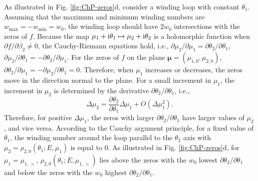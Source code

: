 As illustrated in Fig. \ref{fig:ChP-zeros}d, consider a winding loop
with constant $\theta_{1}$. Assuming that the maximum and minimum
winding numbers are $w_{\text{max}}=-w_{\text{min}}=w_{0}$, the winding
loop should have $2w_{0}$ intersections with the zeros of $f$. Because
the map $\mu_{1}+\mathrm{i}\theta_{1}\mapsto\mu_{2}+\mathrm{i}\theta_{2}$ is
a holomorphic function when $\partial f/\partial\beta_{2}\neq0$,
the Cauchy-Riemann equations hold, i.e., $\partial\mu_{2}/\partial\mu_{1}=\partial\theta_{2}/\partial\theta_{1}$,
$\partial\mu_{2}/\partial\theta_{1}=-\partial\theta_{2}/\partial\mu_{1}$.
For the zeros of $f$ on the plane $\boldsymbol{\mu}=(\mu_{1,0},\mu_{2,0})$,
$\partial\theta_{2}/\partial\mu_{1}=-\partial\mu_{2}/\partial\theta_{1}=0$.
Therefore, when $\mu_{1}$ increases or decreases, the zeros move
in the direction normal to the plane. For a small increment in $\mu_{1}$,
the increment in $\mu_{2}$ is determined by the derivative $\partial\theta_{2}/\partial\theta_{1}$,
i.e., 
\begin{equation}
\Delta\mu_{2}=\frac{\partial\theta_{2}}{\partial\theta_{1}}\Delta\mu_{1}+O\left(\Delta\mu_{1}^{2}\right).
\end{equation}
Therefore, for positive $\Delta\mu_{1}$, the zeros with larger $\partial\theta_{2}/\partial\theta_{1}$
have larger values of $\mu_{2}$, and vice versa. According to the
Cauchy argument principle, for a fixed value of $\theta_{1}$, the
winding number around the loop parallel to the $\theta_{2}$ axis
with $\mu_{2}=\rho_{2,0}(\theta_{1};E,\mu_{1})$ is equal to $0$.
As illustrated in Fig. \ref{fig:ChP-zeros}d, for $\mu_{1}=\mu_{1,>}$,
$\rho_{2,0}(\theta_{1};E,\mu_{1,>})$ lies above the zeros with the
$w_{0}$ lowest $\partial\theta_{2}/\partial\theta_{1}$ and below
the zeros with the $w_{0}$ highest $\partial\theta_{2}/\partial\theta_{1}$.

